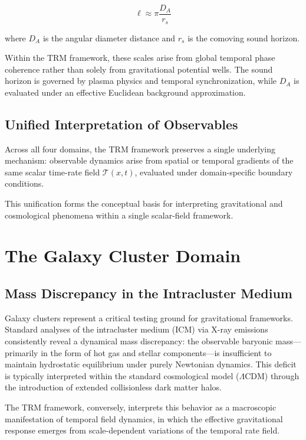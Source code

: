 \documentclass[11pt]{article}
\begin{document}
\begin{equation}
	\ell \approx \pi \frac{D_A}{r_s}
\end{equation}

where $D_A$ is the angular diameter distance and $r_s$ is the comoving sound horizon.

Within the TRM framework, these scales arise from global temporal phase coherence rather than solely from gravitational potential wells. The sound horizon is governed by plasma physics and temporal synchronization, while $D_A$ is evaluated under an effective Euclidean background approximation.

\subsection{Unified Interpretation of Observables}

Across all four domains, the TRM framework preserves a single underlying mechanism: observable dynamics arise from spatial or temporal gradients of the same scalar time-rate field $\mathcal{T}(x,t)$, evaluated under domain-specific boundary conditions.

This unification forms the conceptual basis for interpreting gravitational and cosmological phenomena within a single scalar-field framework.



\section{The Galaxy Cluster Domain}

\subsection{Mass Discrepancy in the Intracluster Medium}

Galaxy clusters represent a critical testing ground for gravitational frameworks. Standard analyses of the intracluster medium (ICM) via X-ray emissions consistently reveal a dynamical mass discrepancy: the observable baryonic mass—primarily in the form of hot gas and stellar components—is insufficient to maintain hydrostatic equilibrium under purely Newtonian dynamics. This deficit is typically interpreted within the standard cosmological model ($\Lambda$CDM) through the introduction of extended collisionless dark matter halos.

The TRM framework, conversely, interprets this behavior as a macroscopic manifestation of temporal field dynamics, in which the effective gravitational response emerges from scale-dependent variations of the temporal rate field.
\end{document}
